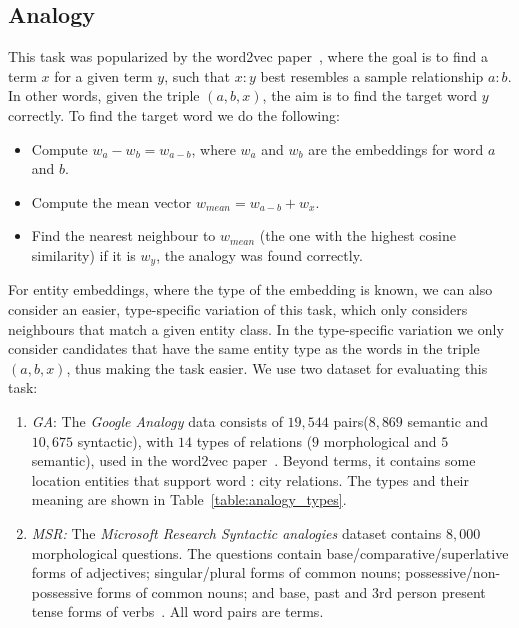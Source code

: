 \subsection{Analogy}
This task was popularized by the word2vec paper~, where the goal is to find a term $x$ for a given term $y$, such that  $x : y$ best resembles a sample relationship $a : b$. In other words, given the triple $(a,b,x)$, the aim is to find the target word $y$ correctly. To find the target word we do the following:  
\begin{itemize}
    \item Compute $w_a-w_b=w_{a-b}$, where $w_a$ and $w_b$ are the embeddings for word $a$ and $b$. 
    \item  Compute the mean vector $w_{mean}=w_{a-b}+w_x$.
    \item  Find the nearest neighbour to $w_{mean}$ (the one with the highest cosine similarity) if it is $w_y$, the analogy was found correctly.
  \end{itemize}
  \noindent
For entity embeddings, where the type of the embedding is known, we can also consider an easier, type-specific variation of this task, which only considers neighbours that match a given entity class. In the type-specific variation we only consider candidates that have the same entity type as the words in the triple $(a,b,x)$, thus making the task easier. We use two dataset for evaluating this task: 
\begin{enumerate}
 \item \emph{GA}: The \emph{Google Analogy} data consists of $19,544$ pairs($8,869$ semantic and $10,675$ syntactic), with $14$ types of relations ($9$ morphological and $5$ semantic), used in the word2vec paper~. Beyond terms, it contains some location entities that support word : city relations. The types and their meaning are shown in Table~\ref{table:analogy_types}.
\item \emph{MSR:} The \emph{Microsoft Research Syntactic analogies} dataset contains $8,000$ morphological questions. The questions contain base/comparative/superlative forms of adjectives; singular/plural forms of common nouns; possessive/non-possessive forms of common nouns; and base, past and 3rd person present tense forms of verbs~\cite{DBLP:conf/naacl/MikolovYZ13}. All word pairs are terms.
\end{enumerate}



